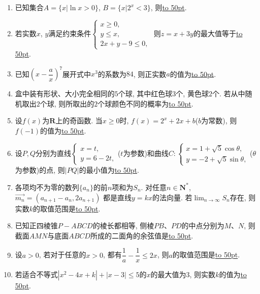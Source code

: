 \documentclass[10pt,a4paper]{article}
\newcommand{\blank}[1]{\underline{\hbox to #1pt{}}}
\begin{document}
\begin{enumerate}[1.]
\item 已知集合$A=\{x|\ln x>0 \}$, $B=\{x|2^x<3\}$, 则\blank{50}.
\item 若实数$x$, $y$满足约束条件$\begin{cases} x\ge 0, \\  y\le x, \\  2x+y-9 \le 0, \end{cases}$ 则$z=x+3y$的最大值等于\blank{50}.
\item 已知$(x-\dfrac ax)^7$展开式中$x^3$的系数为$84$, 则正实数$a$的值为\blank{50}.
\item 盒中装有形状、大小完全相同的$5$个球, 其中红色球$3$个, 黄色球$2$个. 若从中随机取出$2$个球, 则所取出的$2$个球颜色不同的概率为\blank{50}.
\item 设$f(x)$为$\mathbf{R}$上的奇函数. 当$x\ge 0$时, $f(x)=2^x+2x+b$($b$为常数), 则$f(-1)$的值为\blank{50}.
\item 设$P,Q$分别为直线$\begin{cases}  x=t, \\  y=6-2t, \end{cases}$($t$为参数)和曲线$C:\begin{cases} x=1+\sqrt5\cos\theta, \\ y=-2+\sqrt5\sin\theta,\end{cases}$($\theta$为参数)的点, 则$|PQ|$的最小值为\blank{50}.
\item 各项均不为零的数列$\{a_n\}$的前$n$项和为$S_n$.  对任意$n\in \mathbf{N}^*$, $\overrightarrow{m_n}=(a_{n+1}-a_n,2a_{n+1})$
都是直线$y=kx$的法向量. 若$\displaystyle\lim_{n\to\infty}S_n$存在, 则实数$k$的取值范围是\blank{50}.
\item 已知正四棱锥$P-ABCD$的棱长都相等, 侧棱$PB$、$PD$的中点分别为$M$、$N$, 则截面$AMN$与底面$ABCD$所成的二面角的余弦值是\blank{50}.
\item 设$a>0$, 若对于任意的$x>0$, 都有$\dfrac1a-\dfrac1x\le 2x$, 则$a$的取值范围是\blank{50}.
\item 若适合不等式$|x^2-4x+k|+|x-3|\le 5$的$x$的最大值为$3$, 则实数$k$的值为\blank{50}.



\end{enumerate}
\end{document}
